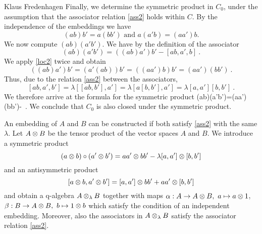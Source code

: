 \begin{artengenv}{Klaus Fredenhagen}
Finally, we determine the symmetric product in $C_0$, under the assumption that the associator relation \eqref{ass2} holds within $C$. By the independence of the embeddings we have
\[(ab)b'=a(bb')\text{ and }a(a'b)=(aa')b. \]
We now compute $(ab)(a'b')$. We have by the definition of the associator
\[(ab)(a'b')=((ab)a')b'-[ab,a',b]\ .\]
We apply \eqref{loc2} twice and obtain
\[((ab)a')b'=(a'(ab))b'=((aa')b)b'=(aa')(bb')\ .\]
Thus, due to the relation \eqref{ass2} between the associators,
\[[ab,a',b']=\lambda[[ab,b'],a']=\lambda [a[b,b'],a']=\lambda[a,a'][b,b']\ .\]
We therefore arrive at the formula for the symmetric product
\be\label{JordanC}(ab)(a'b')=(aa')(bb')-\lambda[a,a'][b,b']\ .\ee
We conclude that $C_0$ is also closed under the symmetric product. %

An embedding of $A$ and $B$ can be constructed if both satisfy \eqref{ass2} with the same $\lambda$. Let $A\otimes B$ be the tensor product of the vector spaces $A$ and $B$. We introduce a symmetric product
\[(a\otimes b)\circ(a'\otimes b')=a a'\otimes b b'-\lambda[a,a']\otimes[b,b']\]
and an antisymmetric product
\[[a\otimes b,a'\otimes b']=[a,a']\otimes b b'+a a'\otimes[b,b']\]
and obtain a q-algebra $A\otimes_\lambda B$ together with maps $\alpha:A\to A\otimes B,\ a\mapsto a\otimes 1$, $\beta:B\to A\otimes B,\ b\mapsto 1\otimes b$ which satisfy the condition of an independent embedding.
Moreover, also the associators in $A\otimes_{\lambda}B$ satisfy the associator relation \eqref{ass2}.


\end{artengenv}
